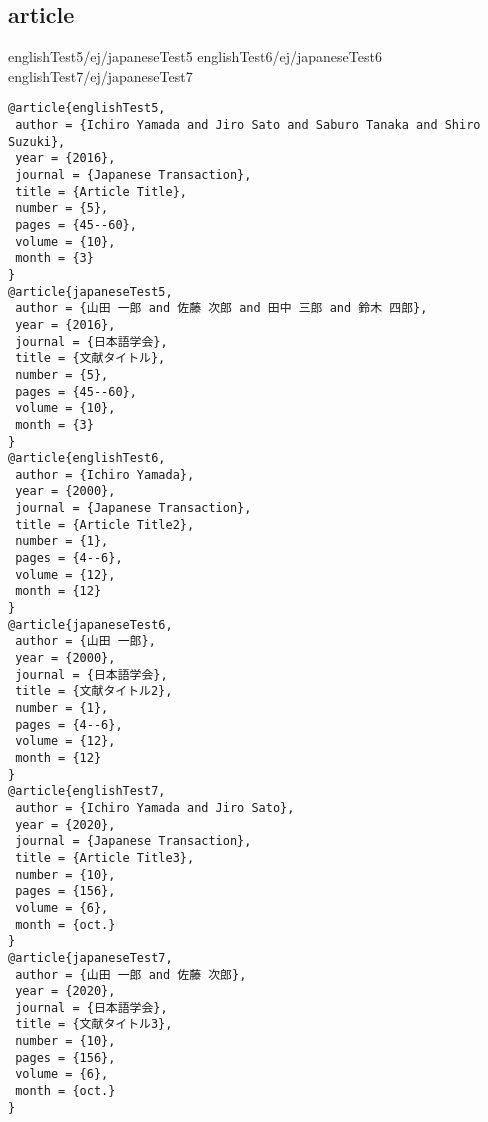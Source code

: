 \documentclass[10pt,a4paper]{article}
\begin{document}
\subsection{article}

englishTest5/ej/japaneseTest5 \cite{englishTest5/ej/japaneseTest5}
englishTest6/ej/japaneseTest6 \cite{englishTest6/ej/japaneseTest6}
englishTest7/ej/japaneseTest7 \cite{englishTest7/ej/japaneseTest7}
\begin{lstlisting}
@article{englishTest5,
 author = {Ichiro Yamada and Jiro Sato and Saburo Tanaka and Shiro Suzuki},
 year = {2016},
 journal = {Japanese Transaction},
 title = {Article Title},
 number = {5},
 pages = {45--60},
 volume = {10},
 month = {3}
}
@article{japaneseTest5,
 author = {山田 一郎 and 佐藤 次郎 and 田中 三郎 and 鈴木 四郎},
 year = {2016},
 journal = {日本語学会},
 title = {文献タイトル},
 number = {5},
 pages = {45--60},
 volume = {10},
 month = {3}
}
@article{englishTest6,
 author = {Ichiro Yamada},
 year = {2000},
 journal = {Japanese Transaction},
 title = {Article Title2},
 number = {1},
 pages = {4--6},
 volume = {12},
 month = {12}
}
@article{japaneseTest6,
 author = {山田 一郎},
 year = {2000},
 journal = {日本語学会},
 title = {文献タイトル2},
 number = {1},
 pages = {4--6},
 volume = {12},
 month = {12}
}
@article{englishTest7,
 author = {Ichiro Yamada and Jiro Sato},
 year = {2020},
 journal = {Japanese Transaction},
 title = {Article Title3},
 number = {10},
 pages = {156},
 volume = {6},
 month = {oct.}
}
@article{japaneseTest7,
 author = {山田 一郎 and 佐藤 次郎},
 year = {2020},
 journal = {日本語学会},
 title = {文献タイトル3},
 number = {10},
 pages = {156},
 volume = {6},
 month = {oct.}
}
\end{lstlisting}

% 
% 



\end{document}
